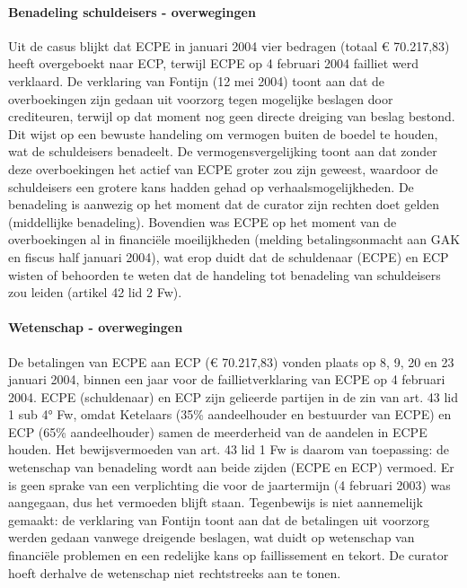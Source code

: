 \documentclass[
  dutch,
  a4paper,
]{article}
\begin{document}
\paragraph{Benadeling schuldeisers - overwegingen}\label{benadeling-schuldeisers---overwegingen-45}

Uit de casus blijkt dat ECPE in januari 2004 vier bedragen (totaal € 70.217,83) heeft overgeboekt naar ECP, terwijl ECPE op 4 februari 2004 failliet werd verklaard. De verklaring van Fontijn (12 mei 2004) toont aan dat de overboekingen zijn gedaan uit voorzorg tegen mogelijke beslagen door crediteuren, terwijl op dat moment nog geen directe dreiging van beslag bestond. Dit wijst op een bewuste handeling om vermogen buiten de boedel te houden, wat de schuldeisers benadeelt. De vermogensvergelijking toont aan dat zonder deze overboekingen het actief van ECPE groter zou zijn geweest, waardoor de schuldeisers een grotere kans hadden gehad op verhaalsmogelijkheden. De benadeling is aanwezig op het moment dat de curator zijn rechten doet gelden (middellijke benadeling). Bovendien was ECPE op het moment van de overboekingen al in financiële moeilijkheden (melding betalingsonmacht aan GAK en fiscus half januari 2004), wat erop duidt dat de schuldenaar (ECPE) en ECP wisten of behoorden te weten dat de handeling tot benadeling van schuldeisers zou leiden (artikel 42 lid 2 Fw).

\paragraph{Wetenschap - overwegingen}\label{wetenschap---overwegingen-45}

De betalingen van ECPE aan ECP (€ 70.217,83) vonden plaats op 8, 9, 20 en 23 januari 2004, binnen een jaar voor de faillietverklaring van ECPE op 4 februari 2004. ECPE (schuldenaar) en ECP zijn gelieerde partijen in de zin van art. 43 lid 1 sub 4° Fw, omdat Ketelaars (35\% aandeelhouder en bestuurder van ECPE) en ECP (65\% aandeelhouder) samen de meerderheid van de aandelen in ECPE houden. Het bewijsvermoeden van art. 43 lid 1 Fw is daarom van toepassing: de wetenschap van benadeling wordt aan beide zijden (ECPE en ECP) vermoed. Er is geen sprake van een verplichting die voor de jaartermijn (4 februari 2003) was aangegaan, dus het vermoeden blijft staan. Tegenbewijs is niet aannemelijk gemaakt: de verklaring van Fontijn toont aan dat de betalingen uit voorzorg werden gedaan vanwege dreigende beslagen, wat duidt op wetenschap van financiële problemen en een redelijke kans op faillissement en tekort. De curator hoeft derhalve de wetenschap niet rechtstreeks aan te tonen.
\end{document}
